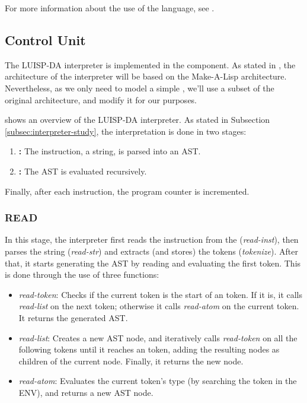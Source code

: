 \noindent
For more information about the use of the language, see .


\subsection{Control Unit}\label{subsec:interpreter-design}
The LUISP-DA \gls{interpreter} is implemented in the  component. As stated in , the architecture of the \gls{interpreter} will be based on the Make-A-Lisp \parencite{mal} architecture. Nevertheless, as we only need to model a simple , we'll use a subset of the original architecture, and modify it for our purposes.

 shows an overview of the LUISP-DA interpreter. As stated in Subsection \ref{subsec:interpreter-study}, the interpretation is done in two stages:
\begin{enumerate}
  \item \textbf{:} The instruction, a string, is parsed into an \gls{AST}.
  \item \textbf{:} The \gls{AST} is evaluated recursively.
\end{enumerate}

Finally, after each instruction, the \gls{program counter} is incremented.



\subsubsection{READ}\label{subsubsec:read}
In this stage, the \gls{interpreter} first reads the instruction from the  (\textit{read-inst}), then parses the string (\textit{read-str}) and extracts (and stores) the tokens (\textit{tokenize}). After that, it starts generating the \gls{AST} by reading and evaluating the first token. This is done through the use of three functions:
\begin{itemize}
  \item \textit{read-token}: Checks if the current token is the start of an  token. If it is, it calls \textit{read-list} on the next token; otherwise it calls \textit{read-atom} on the current token. It returns the generated \gls{AST}.
  \item \textit{read-list}: Creates a new \gls{AST} node, and iteratively calls \textit{read-token} on all the following tokens until it reaches an  token, adding the resulting nodes as children of the current node. Finally, it returns the new node.
  \item \textit{read-atom}: Evaluates the current token's type (by searching the token in the ENV), and returns a new \gls{AST} node.
\end{itemize}


